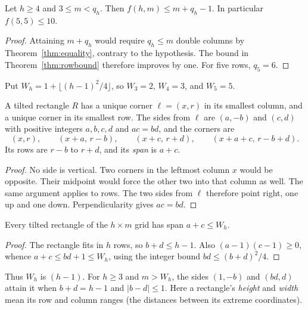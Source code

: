 \begin{corollary}\label{cor:small-m}
Let $h\ge4$ and $3\le m<q_h$. Then $f(h,m)\le m+q_h-1$. In particular $f(5,5)\le10$.
\end{corollary}

\begin{proof}
Attaining $m+q_h$ would require $q_h\le m$ double columns by
Theorem~\ref{thm:equality}, contrary to the hypothesis. The bound in
Theorem~\ref{thm:rowbound} therefore improves by one. For five rows, $q_5=6$.
\end{proof}

Put $W_h=1+\lfloor(h-1)^2/4\rfloor$, so $W_3=2$, $W_4=3$, and $W_5=5$.

\begin{lemma}\label{lem:leftmost}
A tilted rectangle $R$ has a unique corner $\ell=(x,r)$ in its smallest column, and a unique corner in its smallest row. The sides from $\ell$ are $(a,-b)$ and $(c,d)$ with positive integers $a,b,c,d$ and $ac=bd$, and the corners are
\begin{equation}\label{eq:tilt-param}
(x,r),\qquad(x+a,\,r-b),\qquad(x+c,\,r+d),\qquad(x+a+c,\,r-b+d).
\end{equation}
Its rows are $r-b$ to $r+d$, and its \emph{span} is $a+c$.
\end{lemma}

\begin{proof}
No side is vertical. Two corners in the leftmost column
$x$ would be opposite. Their midpoint would force the other two into
that column as well. The same argument applies to rows.
The two sides from $\ell$ therefore point right, one up and one down.
Perpendicularity gives $ac=bd$.
\end{proof}

\begin{lemma}\label{lem:span}
Every tilted rectangle of the $h\times m$ grid has span $a+c\le W_h$.
\end{lemma}

\begin{proof}
The rectangle fits in $h$ rows, so $b+d\le h-1$. Also
$(a-1)(c-1)\ge0$, whence $a+c\le bd+1\le W_h$, using the integer bound
$bd\le(b+d)^2/4$.
\end{proof}

Thus $W_h$ is $(h-1)$. For $h\ge3$ and $m>W_h$,
the sides $(1,-b)$ and $(bd,d)$ attain it when $b+d=h-1$ and $|b-d|\le1$.
Here a rectangle's \emph{height} and \emph{width} mean its row and column
ranges (the distances between its extreme coordinates).


